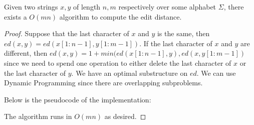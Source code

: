 \begin{theorem}
\label{Edit DP}
    Given two strings $x, y$ of length $n, m$ respectively over some alphabet $\Sigma$, there exists a $O(m n)$ algorithm to compute the edit distance.
\end{theorem}

\begin{proof}
    Suppose that the last character of $x$ and $y$ is the same, then $ed(x, y) = ed(x[1 : n - 1], y[1 : m - 1])$. If the last character of $x$ and $y$ are different, then $ed(x, y) = 1 + min(ed(x[1 : n - 1], y), ed(x, y[1 : m - 1])$ since we need to spend one operation to either delete the last character of $x$ or the last character of $y$. We have an optimal substructure on $ed$. We can use Dynamic Programming since there are overlapping subproblems.

    Below is the pseudocode of the implementation:
    

    The algorithm runs in $O(m n)$ as desired.
\end{proof}
